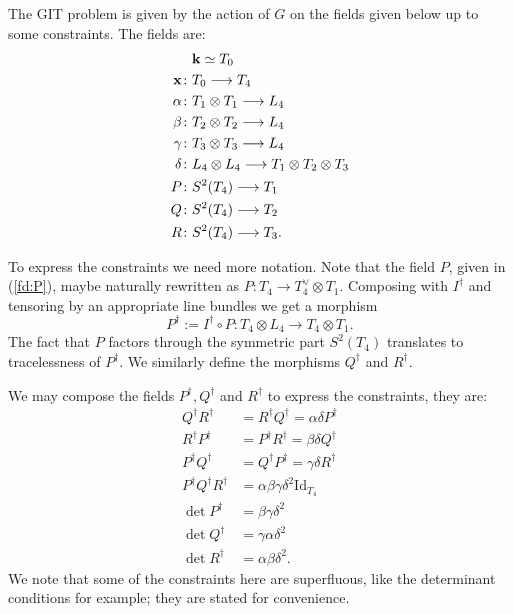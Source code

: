 \documentclass{amsart}
\theoremstyle{definition}
\begin{document}
The GIT problem is given by the action of $G$ on the fields given below up to some constraints.
The fields are:
\begin{align}
&\mathbf{k} \simeq T_0 \\
\mathbf{x} \colon &T_0 \longrightarrow T_4 \label{fd:x} \\
\alpha \colon &T_1 \otimes T_1 \longrightarrow L_4 \label{fd:alpha} \\
\beta \colon &T_2 \otimes T_2 \longrightarrow L_4 \label{fd:beta} \\
\gamma \colon &T_3 \otimes T_3 \longrightarrow L_4 \label{fd:gamma} \\
\delta \colon &L_4 \otimes L_4 \longrightarrow T_1 \otimes T_2 \otimes T_3 \label{fd:delta} \\
P \colon &S^2(T_4) \longrightarrow T_1 \label{fd:P} \\ 
Q \colon &S^2(T_4) \longrightarrow T_2 \label{fd:Q} \\
R \colon &S^2(T_4) \longrightarrow T_3. \label{fd:R}
\end{align}

To express the constraints we need more notation.
Note that the field $P$, given in (\ref{fd:P}), maybe naturally rewritten as $P \colon T_4 \rightarrow T_4^\vee \otimes T_1$.
Composing with $I^\dagger$ and tensoring by an appropriate line bundles we get a morphism $$P^\dagger:= I^\dagger \circ P \colon T_4 \otimes L_4 \rightarrow T_4 \otimes T_1.$$
The fact that $P$ factors through the symmetric part $S^2(T_4)$ translates to tracelessness of $P^\dagger$.
We similarly define the morphisms $Q^\dagger$ and $R^\dagger$.

We may compose the fields $P^\dagger,Q^\dagger$ and $R^\dagger$ to express the constraints, they
are:
\begin{align}
    Q^\dagger R^\dagger &= R^\dagger Q^\dagger = \alpha \delta P^\dagger \label{con:qr} \\
    R^\dagger P^\dagger &= P^\dagger R^\dagger = \beta \delta Q^\dagger \label{con:rp} \\
    P^\dagger Q^\dagger &= Q^\dagger P^\dagger = \gamma \delta R^\dagger \label{con:pq} \\
    P^\dagger Q^\dagger R^\dagger &= \alpha \beta \gamma \delta^2 \text{Id}_{T_4} \label{con:pqr} \\
    \det P^\dagger &= \beta \gamma \delta^2 \\
    \det Q^\dagger &= \gamma \alpha \delta^2 \\
    \det R^\dagger &= \alpha \beta \delta^2.
\end{align}
We note that some of the constraints here are superfluous, like the determinant conditions for example; they are stated for convenience.
\end{document}
